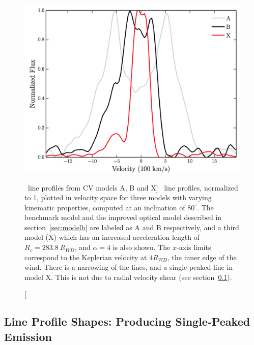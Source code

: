 \begin{figure}
\centering
\includegraphics[width=1.0\textwidth]{figures/05-cvpaper/mc.png}
\caption
[\ha\ line profiles from CV models A, B and X]
{
\ha\ line profiles, normalized to 1, plotted in velocity space 
for three models with varying kinematic 
properties, computed at an inclination of $80^\circ$.
The benchmark model and the improved optical
model described in section~\ref{sec:modelb} are labeled as A and B respectively,
and a third model (X) which has an increased acceleration length of 
$R_v = 283.8~R_{WD}$, and $\alpha=4$ is also shown. 
The $x$-axis limits correspond to the Keplerian velocity at 
$4R_{WD}$, the inner edge of the wind.
There is a narrowing of the lines, and a single-peaked line in model X.
This is not due to radial velocity shear (see section~\ref{sec:cv_line_shapes}).
}
\label{halpha}
\end{figure} %






\subsection{Line Profile Shapes: Producing Single-Peaked Emission}
\label{sec:cv_line_shapes}

